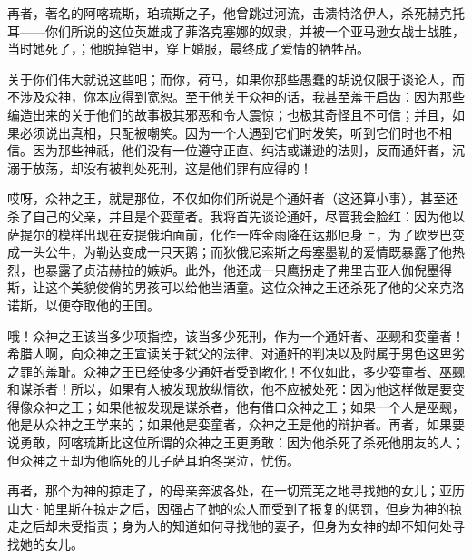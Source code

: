 再者，著名的阿喀琉斯，珀琉斯之子，他曾跳过河流，击溃特洛伊人，杀死赫克托耳——你们所说的这位英雄成了菲洛克塞娜的奴隶，并被一个亚马逊女战士战胜，当时她死了，；他脱掉铠甲，穿上婚服，最终成了爱情的牺牲品。\par

关于你们伟大就说这些吧；而你，荷马，如果你那些愚蠢的胡说仅限于谈论人，而不涉及众神，你本应得到宽恕。至于他关于众神的话，我甚至羞于启齿：因为那些编造出来的关于他们的故事极其邪恶和令人震惊；也极其奇怪且不可信；并且，如果必须说出真相，只配被嘲笑。因为一个人遇到它们时发笑，听到它们时也不相信。因为那些神祇，他们没有一位遵守正直、纯洁或谦逊的法则，反而通奸者，沉溺于放荡，却没有被判处死刑，这是他们罪有应得的！\par

哎呀，众神之王，就是那位，不仅如你们所说是个通奸者（这还算小事），甚至还杀了自己的父亲，并且是个娈童者。我将首先谈论通奸，尽管我会脸红：因为他以萨提尔的模样出现在安提俄珀面前，化作一阵金雨降在达那厄身上，为了欧罗巴变成一头公牛，为勒达变成一只天鹅；而狄俄尼索斯之母塞墨勒的爱情既暴露了他热烈，也暴露了贞洁赫拉的嫉妒。此外，他还成一只鹰拐走了弗里吉亚人伽倪墨得斯，让这个美貌俊俏的男孩可以给他当酒童。这位众神之王还杀死了他的父亲克洛诺斯，以便夺取他的王国。\par

哦！众神之王该当多少项指控，该当多少死刑，作为一个通奸者、巫觋和娈童者！希腊人啊，向众神之王宣读关于弑父的法律、对通奸的判决以及附属于男色这卑劣之罪的羞耻。众神之王已经使多少通奸者受到教化！不仅如此，多少娈童者、巫觋和谋杀者！所以，如果有人被发现放纵情欲，他不应被处死：因为他这样做是要变得像众神之王；如果他被发现是谋杀者，他有借口众神之王；如果一个人是巫觋，他是从众神之王学来的；如果他是娈童者，众神之王是他的辩护者。再者，如果要说勇敢，阿喀琉斯比这位所谓的众神之王更勇敢：因为他杀死了杀死他朋友的人；但众神之王却为他临死的儿子萨耳珀冬哭泣，忧伤。\par

再者，那个为神的掠走了，的母亲奔波各处，在一切荒芜之地寻找她的女儿；亚历山大·帕里斯在掠走之后，因强占了她的恋人而受到了报复的惩罚，但身为神的掠走之后却未受指责；身为人的知道如何寻找他的妻子，但身为女神的却不知何处寻找她的女儿。\par

